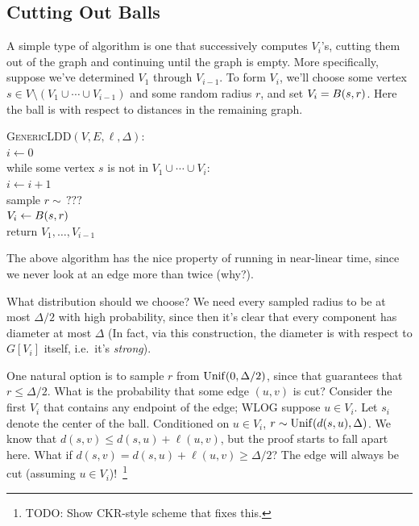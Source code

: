 \documentclass[12pt]{article}
\begin{document}
\subsection{Cutting Out Balls}

\def\Unif#1{\operatorname{Unif}\paren{#1}}
\def\Geom#1{\operatorname{Geom}\paren{#1}}
\def\Exp#1{\operatorname{Exp}\paren{#1}}

A simple type of algorithm is one that successively computes $V_i$'s, cutting
them out of the graph and continuing until the graph is empty. More
specifically, suppose we've determined $V_1$ through $V_{i-1}$. To form $V_i$,
we'll choose some vertex $s \in V \setminus (V_1 \cup \cdots \cup V_{i-1})$ and
some random radius $r$, and set $V_i = \ball{s, r}$. Here the ball is with
respect to distances in the remaining graph.

\begin{centeralgo}
  \textsc{GenericLDD}$(V, E, \ell, \Delta)$:\+
  \\  $i \gets 0$
  \\  while some vertex $s$ is not in $V_1 \cup \cdots \cup V_i$:\+
  \\    $i \gets i + 1$
  \\    sample $r \sim \,???$ 
  \\    $V_i \gets \ball{s, r}$ \-
  \\  return $V_1, \dots, V_{i - 1}$
\end{centeralgo}
The above algorithm has the nice property of running in near-linear time, since
we never look at an edge more than twice (why?).

What distribution should we choose? We need every sampled radius to be at most
$\Delta/2$ with high probability, since then it's clear that every component has
diameter at most $\Delta$ (In fact, via this construction, the diameter is with
respect to $G[V_i]$ itself, i.e.\ it's \emph{strong}).

One natural option is to sample $r$ from $\Unif{0, \Delta/2}$, since that
guarantees that $r \leq \Delta/2$. What is the probability that some edge
$(u, v)$ is cut? Consider the first $V_i$ that contains any endpoint of the
edge; WLOG suppose $u \in V_i$. Let $s_i$ denote the center of the ball.
Conditioned on $u \in V_i$, $r \sim \Unif{d(s, u), \Delta}$. We know that
$d(s, v) \leq d(s, u) + \ell(u, v)$, but the proof starts to fall apart here.
What if $d(s, v) = d(s, u) + \ell(u, v) \geq \Delta/2$? The edge will always be
cut (assuming $u \in V_i$)!~\footnote{TODO: Show CKR-style scheme that fixes
this.}
\end{document}
